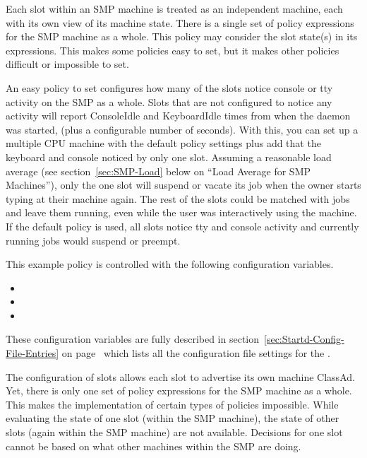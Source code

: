 Each slot within an SMP machine is treated as an
independent machine,
each with its own view of its machine state.
There is a single set of policy expressions for the SMP machine
as a whole.
This policy may consider the slot state(s) in its expressions.
This makes some policies easy to set, but it makes
other policies difficult or impossible to set.

An easy policy to set
configures how many of the slots
notice console or tty activity on the SMP as a whole.
Slots that are not configured to notice any activity will report
ConsoleIdle and KeyboardIdle times from when the
 daemon was started,
(plus a configurable number of seconds).
With this, you can set up a multiple CPU machine with
the default policy
settings plus add that the keyboard and console noticed by only one
slot.
Assuming a reasonable load average (see
section~\ref{sec:SMP-Load} below on ``Load Average for SMP
Machines''), only the one slot will suspend or vacate its job
when the owner starts typing at their machine again.
The rest of the slots could be matched with jobs and leave
them running, even while the user was interactively using the
machine. 
If the default policy is used,
all slots notice
tty and console activity
and
currently running jobs would suspend or preempt.

This example policy is
controlled with the following configuration variables.
\begin{itemize}
\item {}
\item {}
\item {}
\end{itemize}

These configuration variables are fully described in
section~\ref{sec:Startd-Config-File-Entries} on
page~\pageref{sec:Startd-Config-File-Entries} which lists all the
configuration file settings for the .

The configuration of slots allows each slot to advertise
its own machine ClassAd.
Yet, there is only one set of policy expressions for the SMP
machine as a whole.
This makes the implementation of certain types of policies impossible.
While evaluating the state of one slot (within the SMP machine),
the state of other slots (again within the SMP machine) are not
available.
Decisions for one slot cannot be based on what other machines within the SMP
are doing.

